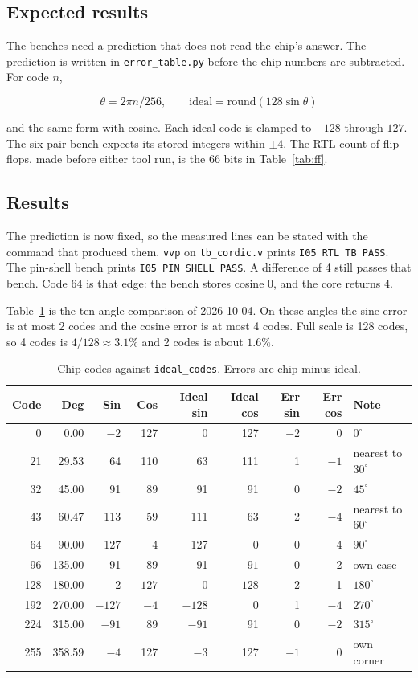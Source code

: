 \documentclass[11pt,a4paper]{article}
\begin{document}
\subsection{Expected results}
The benches need a prediction that does not read the chip's answer. The prediction is written in \texttt{error\_table.py} before the chip numbers are subtracted. For code \(n\),

\[
\theta = 2\pi n / 256, \qquad
\text{ideal} = \mathrm{round}(128 \sin\theta)
\]

and the same form with cosine. Each ideal code is clamped to \(-128\) through \(127\). The six-pair bench expects its stored integers within \(\pm 4\). The RTL count of flip-flops, made before either tool run, is the 66 bits in Table~\ref{tab:ff}.

\subsection{Results}
The prediction is now fixed, so the measured lines can be stated with the command that produced them. \texttt{vvp} on \texttt{tb\_cordic.v} prints \texttt{I05 RTL TB PASS}. The pin-shell bench prints \texttt{I05 PIN SHELL PASS}. A difference of 4 still passes that bench. Code 64 is that edge: the bench stores cosine 0, and the core returns 4.

Table~\ref{tab:error} is the ten-angle comparison of 2026-10-04. On these angles the sine error is at most 2 codes and the cosine error is at most 4 codes. Full scale is 128 codes, so 4 codes is \(4/128 \approx 3.1\%\) and 2 codes is about \(1.6\%\).

\begin{table}[ht]
\centering
\caption{Chip codes against \texttt{ideal\_codes}. Errors are chip minus ideal.}
\label{tab:error}
\scriptsize
\begin{tabular}{rrrrrrrrl}
\toprule
Code & Deg & Sin & Cos & Ideal sin & Ideal cos & Err sin & Err cos & Note \\
\midrule
0 & 0.00 & $-2$ & 127 & 0 & 127 & $-2$ & 0 & \(0^\circ\) \\
21 & 29.53 & 64 & 110 & 63 & 111 & 1 & $-1$ & nearest to \(30^\circ\) \\
32 & 45.00 & 91 & 89 & 91 & 91 & 0 & $-2$ & \(45^\circ\) \\
43 & 60.47 & 113 & 59 & 111 & 63 & 2 & $-4$ & nearest to \(60^\circ\) \\
64 & 90.00 & 127 & 4 & 127 & 0 & 0 & 4 & \(90^\circ\) \\
96 & 135.00 & 91 & $-89$ & 91 & $-91$ & 0 & 2 & own case \\
128 & 180.00 & 2 & $-127$ & 0 & $-128$ & 2 & 1 & \(180^\circ\) \\
192 & 270.00 & $-127$ & $-4$ & $-128$ & 0 & 1 & $-4$ & \(270^\circ\) \\
224 & 315.00 & $-91$ & 89 & $-91$ & 91 & 0 & $-2$ & \(315^\circ\) \\
255 & 358.59 & $-4$ & 127 & $-3$ & 127 & $-1$ & 0 & own corner \\
\bottomrule
\end{tabular}
\end{table}
\end{document}
